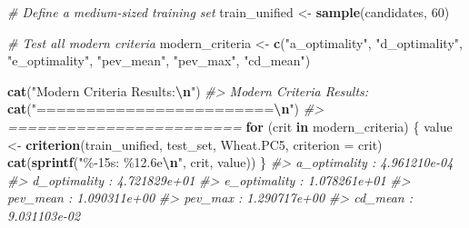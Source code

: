 \documentclass[
]{article}
\newenvironment{Shaded}{\begin{snugshade}}{\end{snugshade}}
\newcommand{\AttributeTok}[1]{\textcolor[rgb]{0.13,0.29,0.53}{#1}}
\newcommand{\CommentTok}[1]{\textcolor[rgb]{0.56,0.35,0.01}{\textit{#1}}}
\newcommand{\ControlFlowTok}[1]{\textcolor[rgb]{0.13,0.29,0.53}{\textbf{#1}}}
\newcommand{\DecValTok}[1]{\textcolor[rgb]{0.00,0.00,0.81}{#1}}
\newcommand{\FunctionTok}[1]{\textcolor[rgb]{0.13,0.29,0.53}{\textbf{#1}}}
\newcommand{\NormalTok}[1]{#1}
\newcommand{\OtherTok}[1]{\textcolor[rgb]{0.56,0.35,0.01}{#1}}
\newcommand{\SpecialCharTok}[1]{\textcolor[rgb]{0.81,0.36,0.00}{\textbf{#1}}}
\newcommand{\StringTok}[1]{\textcolor[rgb]{0.31,0.60,0.02}{#1}}
\begin{document}
\begin{Shaded}
\begin{Highlighting}[]
\CommentTok{\# Define a medium{-}sized training set}
\NormalTok{train\_unified }\OtherTok{\textless{}{-}} \FunctionTok{sample}\NormalTok{(candidates, }\DecValTok{60}\NormalTok{)}

\CommentTok{\# Test all modern criteria}
\NormalTok{modern\_criteria }\OtherTok{\textless{}{-}} \FunctionTok{c}\NormalTok{(}\StringTok{"a\_optimality"}\NormalTok{, }\StringTok{"d\_optimality"}\NormalTok{, }\StringTok{"e\_optimality"}\NormalTok{, }
                     \StringTok{"pev\_mean"}\NormalTok{, }\StringTok{"pev\_max"}\NormalTok{, }\StringTok{"cd\_mean"}\NormalTok{)}

\FunctionTok{cat}\NormalTok{(}\StringTok{"Modern Criteria Results:}\SpecialCharTok{\textbackslash{}n}\StringTok{"}\NormalTok{)}
\CommentTok{\#\textgreater{} Modern Criteria Results:}
\FunctionTok{cat}\NormalTok{(}\StringTok{"========================}\SpecialCharTok{\textbackslash{}n}\StringTok{"}\NormalTok{)}
\CommentTok{\#\textgreater{} ========================}
\ControlFlowTok{for}\NormalTok{ (crit }\ControlFlowTok{in}\NormalTok{ modern\_criteria) \{}
\NormalTok{  value }\OtherTok{\textless{}{-}} \FunctionTok{criterion}\NormalTok{(train\_unified, test\_set, Wheat.PC5, }\AttributeTok{criterion =}\NormalTok{ crit)}
  \FunctionTok{cat}\NormalTok{(}\FunctionTok{sprintf}\NormalTok{(}\StringTok{"\%{-}15s: \%12.6e}\SpecialCharTok{\textbackslash{}n}\StringTok{"}\NormalTok{, crit, value))}
\NormalTok{\}}
\CommentTok{\#\textgreater{} a\_optimality   : 4.961210e{-}04}
\CommentTok{\#\textgreater{} d\_optimality   : 4.721829e+01}
\CommentTok{\#\textgreater{} e\_optimality   : 1.078261e+01}
\CommentTok{\#\textgreater{} pev\_mean       : 1.090311e+00}
\CommentTok{\#\textgreater{} pev\_max        : 1.290717e+00}
\CommentTok{\#\textgreater{} cd\_mean        : 9.031103e{-}02}


\end{Highlighting}
\end{Shaded}
\end{document}
